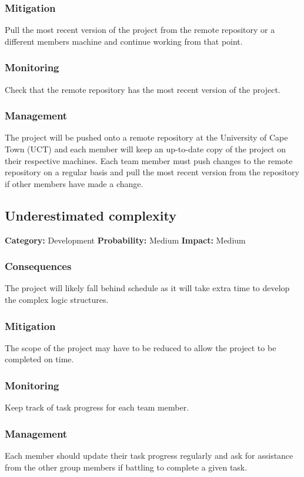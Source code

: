 \documentclass[a4paper,10pt]{article}
\begin{document}
\subsubsection*{Mitigation}
Pull the most recent version of the project from the remote repository or a different members machine and continue working from that point.
\subsubsection*{Monitoring}
Check that the remote repository has the most recent version of the project.
\subsubsection*{Management}
The project will be pushed onto a remote repository at the University of Cape Town (UCT) and each member will keep an up-to-date copy of the project on their respective machines. Each team member must push changes to the remote repository on a regular basis and pull the most recent version from the repository if other members have made a change.

\subsection{Underestimated complexity}
\textbf{Category:} Development\newline
\textbf{Probability:} Medium\newline
\textbf{Impact:} Medium
\subsubsection*{Consequences}
The project will likely fall behind schedule as it will take extra time to develop the complex logic structures. 
\subsubsection*{Mitigation}
The scope of the project may have to be reduced to allow the project to be completed on time. 
\subsubsection*{Monitoring}
Keep track of task progress for each team member.
\subsubsection*{Management}
Each member should update their task progress regularly and ask for assistance from the other group members if battling to complete a given task.
\end{document}
